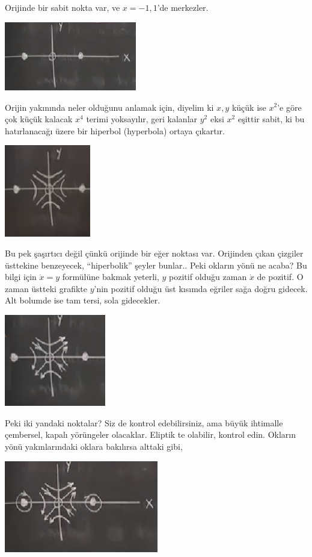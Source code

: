 \documentclass[12pt,fleqn]{article}\usepackage{../../common}
\begin{document}
Orijinde bir sabit nokta var, ve $x=-1,1$'de merkezler.


\includegraphics[height=3cm]{07_04.png}

Orijin yakınında neler olduğunu anlamak için, diyelim ki $x,y$ küçük ise $x^2$'e
göre çok küçük kalacak $x^4$ terimi yoksayılır, geri kalanlar $y^2$ eksi $x^2$
eşittir sabit, ki bu hatırlanacağı üzere bir hiperbol (hyperbola) ortaya
çıkartır. 

\includegraphics[height=4cm]{07_05.png}

Bu pek şaşırtıcı değil çünkü orijinde bir eğer noktası var. Orijinden çıkan
çizgiler üsttekine benzeyecek, ``hiperbolik'' şeyler bunlar.. Peki okların yönü
ne acaba? Bu bilgi için $\dot{x} = y$ formülüne bakmak yeterli, $y$ pozitif
olduğu zaman $\dot{x}$ de pozitif. O zaman üstteki grafikte $y$'nin pozitif
olduğu üst kısımda eğriler sağa doğru gidecek. Alt bolumde ise tam tersi, sola
gidecekler. 

\includegraphics[height=4cm]{07_06.png}

Peki iki yandaki noktalar? Siz de kontrol edebilirsiniz, ama büyük ihtimalle
çembersel, kapalı yörüngeler olacaklar. Eliptik te olabilir, kontrol
edin. Okların yönü yakınlarındaki oklara bakılırsa alttaki gibi,

\includegraphics[height=4cm]{07_07.png}
\end{document}
